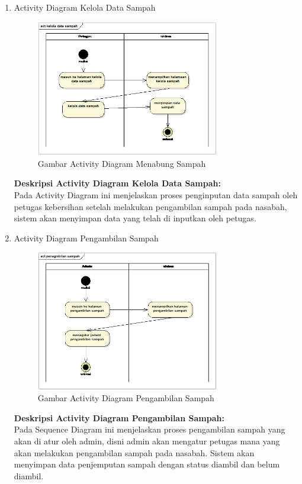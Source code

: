 \begin{enumerate}
\item Activity Diagram Kelola Data Sampah
\hfill\\
	\begin{figure}[H]
		\includegraphics[width=8cm]{figures/analisis/14.png}
		\centering
		\caption{Gambar Activity Diagram Menabung Sampah}
	\end{figure}
\textbf{Deskripsi Activity Diagram Kelola Data Sampah:}
\hfill\\
Pada Activity Diagram ini menjelaskan proses penginputan data sampah oleh petugas kebersihan setelah melakukan pengambilan sampah pada nasabah, sistem akan menyimpan data yang telah di inputkan oleh petugas. 
	
\item Activity Diagram Pengambilan Sampah
\hfill\\
	\begin{figure}[H]
		\includegraphics[width=8cm]{figures/analisis/15.png}
		\centering
		\caption{Gambar Activity Diagram Pengambilan Sampah}
	\end{figure}
\textbf{Deskripsi Activity Diagram Pengambilan Sampah:}
\hfill\\
Pada Sequence Diagram ini menjelaskan proses pengambilan sampah yang akan di atur oleh admin, disni admin akan mengatur petugas mana yang akan melakukan pengambilan sampah pada nasabah. Sistem akan menyimpan data penjemputan sampah dengan status diambil dan belum diambil.
	
\end{enumerate}


